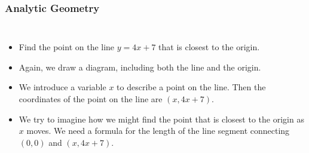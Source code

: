 \documentclass[serif,ignorenonframetext]{beamer}
\begin{document}
\begin{frame}
\begin{columns}
  \end{columns}
\end{frame}

\begin{frame}
  \frametitle{Analytic Geometry}
  \begin{columns}
  \begin{itemize}[<+->]
  \item Find the point on the line $y=4x+7$ that is closest to the origin.
  \item Again, we draw a diagram, including both the line and the origin.
  \item We introduce a variable $x$ to describe a point on the line.  Then
    the coordinates of the point on the line are $(x,4x+7)$.
  \item We try to imagine how we might find the point that is closest to
    the origin as $x$ moves.  We need a formula for the length of the
    line segment connecting $(0,0)$ and $(x,4x+7)$.
  \end{itemize}

\end{columns}
\end{frame}
\end{document}
